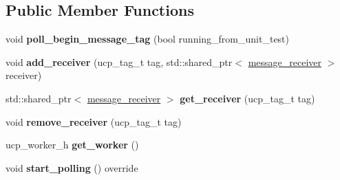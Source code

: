 \subsection*{Public Member Functions}
\begin{DoxyCompactItemize}
\item 
\mbox{\label{classcomm_1_1ucx__message__listener_a09fcfb37e82ed351d3f164084b715593}} 
void {\bfseries poll\+\_\+begin\+\_\+message\+\_\+tag} (bool running\+\_\+from\+\_\+unit\+\_\+test)
\item 
\mbox{\label{classcomm_1_1ucx__message__listener_a315a3053a11bb7415f5f300c5608a658}} 
void {\bfseries add\+\_\+receiver} (ucp\+\_\+tag\+\_\+t tag, std\+::shared\+\_\+ptr$<$ \hyperlink{classcomm_1_1message__receiver}{message\+\_\+receiver} $>$ receiver)
\item 
\mbox{\label{classcomm_1_1ucx__message__listener_a07a5f65b3759daa8b4d4dc14fad160ce}} 
std\+::shared\+\_\+ptr$<$ \hyperlink{classcomm_1_1message__receiver}{message\+\_\+receiver} $>$ {\bfseries get\+\_\+receiver} (ucp\+\_\+tag\+\_\+t tag)
\item 
\mbox{\label{classcomm_1_1ucx__message__listener_a7b3206c978454f72e298cd0d1551adad}} 
void {\bfseries remove\+\_\+receiver} (ucp\+\_\+tag\+\_\+t tag)
\item 
\mbox{\label{classcomm_1_1ucx__message__listener_a110d2273e5204f635d0ea4dd741ea9d5}} 
ucp\+\_\+worker\+\_\+h {\bfseries get\+\_\+worker} ()
\item 
\mbox{\label{classcomm_1_1ucx__message__listener_af1a4505bc00a67076d7376543c88ce55}} 
void {\bfseries start\+\_\+polling} () override
\end{DoxyCompactItemize}
